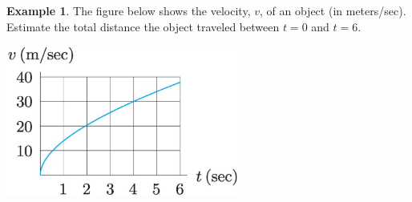 \documentclass[oneside]{book}
\theoremstyle{definition}
\newtheorem{example}{Example}
\newcommand{\handoutpagebreak}{}
\theoremstyle{solution}
\newcommand{\handoutpagebreak}{\newpage}
\begin{document}
\handoutpagebreak
\begin{example}
  The figure below shows the velocity, $v$, of an object (in
  meters/sec).  Estimate the total distance the object traveled
  between $t=0$ and $t=6$.
  \begin{center}
\includegraphics[width=3in]{Images/s5-1prob7}
  \end{center}
\end{example}
\end{document}

